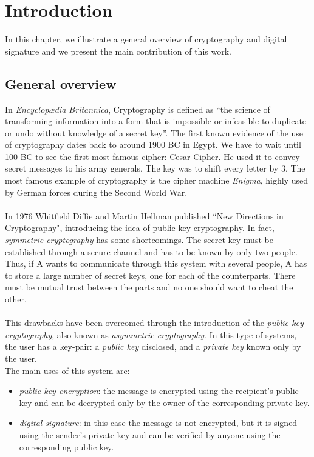 \chapter{Introduction}
\label{Introduzione}

In this chapter, we illustrate a general overview of cryptography and digital signature and we present the main contribution of this work.
\section{General overview}
In \textit{Encyclop\ae dia Britannica\cite{EnBrit}}, Cryptography is defined as ``the science of transforming information into a form that is impossible or infeasible to duplicate or undo without knowledge of a secret key''. The first known evidence of the use of cryptography dates back to around 1900 BC in Egypt. We have to wait until 100 BC to see the first most famous cipher: Cesar Cipher. He used it to convey secret messages to his army generals. The key was to shift every letter by 3. The most famous example of cryptography is the cipher machine \textit{Enigma}, highly used by German forces during the Second World War.\\
\\
In 1976 Whitfield Diffie and Martin Hellman published ``New Directions in Cryptography", introducing the idea of
public key cryptography. In fact, \textit{symmetric cryptography} has some shortcomings. The  secret key must be established through a secure channel and has to be known by only two people. Thus, if A wants to communicate through this system with several people, A has to store a large number of secret keys, one for each of the counterparts. There must be mutual trust between the parts and no one should want to cheat the other.\\
\\
This drawbacks have been overcomed through the introduction of the \textit{public key cryptography}, also known as \textit{asymmetric cryptography}. In this type of systems, the user has a key-pair: a \textit{public key} disclosed, and a \textit{private key} known only by the user. \\
The main uses of this system are:
\begin{itemize}
	\item \textit{public key encryption}: the message is encrypted using the recipient's public key and can be decrypted only by the owner of the corresponding private key.
	\item \textit{digital signature}: in this case the message is not encrypted, but it is signed using the sender's private key and can be verified by anyone using the corresponding public key.
\end{itemize} 
